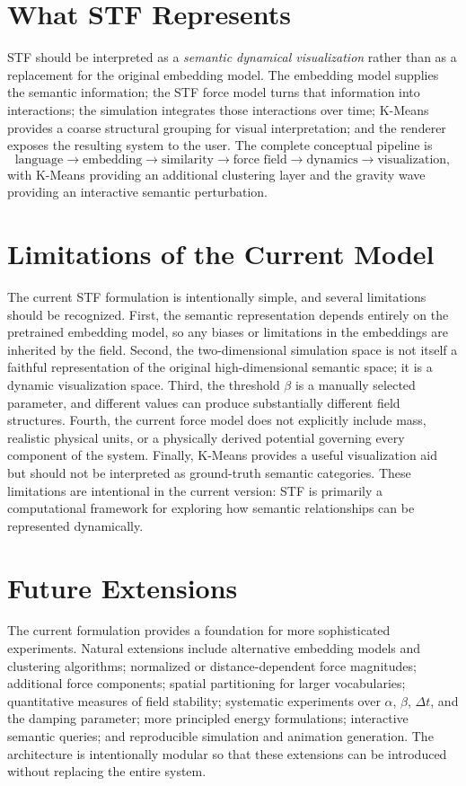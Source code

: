 \documentclass[11pt]{amsart}
\begin{document}
\section{What STF Represents}

STF should be interpreted as a \emph{semantic dynamical visualization} rather
than as a replacement for the original embedding model. The embedding model
supplies the semantic information; the STF force model turns that information
into interactions; the simulation integrates those interactions over time;
K-Means provides a coarse structural grouping for visual interpretation; and
the renderer exposes the resulting system to the user. The complete conceptual
pipeline is
\[
\boxed{
\text{language} \rightarrow \text{embedding} \rightarrow \text{similarity}
\rightarrow \text{force field} \rightarrow \text{dynamics}
\rightarrow \text{visualization},
}
\]
with K-Means providing an additional clustering layer and the gravity wave
providing an interactive semantic perturbation.

\section{Limitations of the Current Model}

The current STF formulation is intentionally simple, and several limitations
should be recognized. First, the semantic representation depends entirely on
the pretrained embedding model, so any biases or limitations in the embeddings
are inherited by the field. Second, the two-dimensional simulation space is not
itself a faithful representation of the original high-dimensional semantic
space; it is a dynamic visualization space. Third, the threshold $\beta$ is a
manually selected parameter, and different values can produce substantially
different field structures. Fourth, the current force model does not explicitly
include mass, realistic physical units, or a physically derived potential
governing every component of the system. Finally, K-Means provides a useful
visualization aid but should not be interpreted as ground-truth semantic
categories. These limitations are intentional in the current version: STF is
primarily a computational framework for exploring how semantic relationships
can be represented dynamically.

\section{Future Extensions}

The current formulation provides a foundation for more sophisticated
experiments. Natural extensions include alternative embedding models and
clustering algorithms; normalized or distance-dependent force magnitudes;
additional force components; spatial partitioning for larger vocabularies;
quantitative measures of field stability; systematic experiments over
$\alpha$, $\beta$, $\Delta t$, and the damping parameter; more principled
energy formulations; interactive semantic queries; and reproducible simulation
and animation generation. The architecture is intentionally modular so that
these extensions can be introduced without replacing the entire system.
\end{document}
